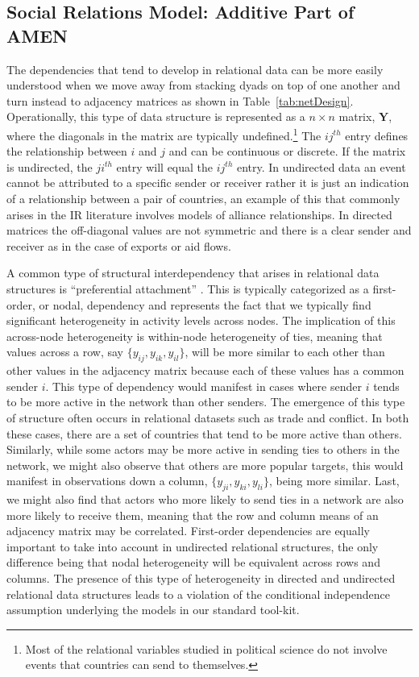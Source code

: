 \subsection{Social Relations Model: Additive Part of AMEN}

The dependencies that tend to develop in relational data can be more easily understood when we move away from stacking dyads on top of one another and turn instead to adjacency matrices as shown in Table~\ref{tab:netDesign}. Operationally, this type of data structure is represented as a $n \times n$ matrix, $\mathbf{Y}$, where the diagonals in the matrix are typically undefined.\footnote{Most of the relational variables studied in political science do not involve events that countries can send to themselves.} The $ij^{th}$ entry defines the relationship between $i$ and $j$ and can be continuous or discrete. If the matrix is undirected, the $ji^{th}$ entry will equal the $ij^{th}$ entry. In undirected data an event cannot be attributed to a specific sender or receiver rather it is just an indication of a relationship between a pair of countries, an example of this that commonly arises in the IR literature involves models of alliance relationships. In directed matrices the off-diagonal values are not symmetric and there is a clear sender and receiver as in the case of exports or aid flows.  

A common type of structural interdependency that arises in relational data structures is ``preferential attachment'' \citep{reka:etal:1999}. This is typically categorized as a first-order, or nodal, dependency and represents the fact that we typically find significant heterogeneity in activity levels across nodes. The implication of this across-node heterogeneity is within-node heterogeneity of ties, meaning that values across a row, say $\{y_{ij},y_{ik},y_{il}\}$, will be more similar to each other than other values in the adjacency matrix because each of these values has a common sender $i$. This type of dependency would manifest in cases where sender $i$ tends to be more active in the network than other senders. The emergence of this type of structure often occurs in relational datasets such as trade and conflict. In both these cases, there are a set of countries that tend to be more active than others. Similarly, while some actors may be more active in sending ties to others in the network, we might also observe that others are more popular targets, this would manifest in observations down a column, $\{y_{ji},y_{ki},y_{li}\}$, being more similar. Last, we might also find that actors who more likely to send ties in a network are also more likely to receive them, meaning that the row and column means of an adjacency matrix may be correlated. First-order dependencies are equally important to take into account in undirected relational structures, the only difference being that nodal heterogeneity will be equivalent across rows and columns. The presence of this type of heterogeneity in directed and undirected relational data structures leads to a violation of the conditional independence assumption underlying the models in our standard tool-kit.

